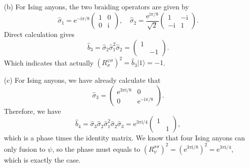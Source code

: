 \documentclass{book}
\begin{document}
(b) For Ising anyons, the two braiding operators are given by
\begin{equation*}
\hat{\sigma }_{1} =\mathrm{e}^{-\mathrm{i} \pi /8}\begin{pmatrix}
1 & 0\\
0 & \mathrm{i}
\end{pmatrix} ,\quad \hat{\sigma }_{2} =\frac{\mathrm{e}^{\mathrm{i} \pi /8}}{\sqrt{2}}\begin{pmatrix}
1 & -\mathrm{i}\\
-\mathrm{i} & 1
\end{pmatrix} .
\end{equation*}
Direct calculation gives
\begin{equation*}
\hat{b}_{3} =\hat{\sigma }_{2}\hat{\sigma }_{1}^{2}\hat{\sigma }_{2} =\begin{pmatrix}
1 & \\
 & -1
\end{pmatrix} .
\end{equation*}
Which indicates that actually $(R_{\sigma }^{\psi \sigma } )^{2} =\hat{b}_{3} |1 \rangle =-1$. 



(c) For Ising anyons, we have already calculate that
\begin{equation*}
\hat{\sigma }_{3} =\begin{pmatrix}
\mathrm{e}^{3\pi \mathrm{i} /8} & 0\\
0 & \mathrm{e}^{-\mathrm{i} \pi /8}
\end{pmatrix} .
\end{equation*}
Therefore, we have
\begin{equation*}
\hat{b}_{4} =\hat{\sigma }_{3}\hat{\sigma }_{2}\hat{\sigma }_{1}^{2}\hat{\sigma }_{2}\hat{\sigma }_{3} =\mathrm{e}^{3\pi \mathrm{i} /4}\begin{pmatrix}
1 & \\
 & 1
\end{pmatrix} ,
\end{equation*}
which is a phase times the identity matrix. We know that four Ising anyons can only fusion to $\psi $, so the phase must equals to $(R_{\psi }^{\sigma \sigma } )^{2} =(\mathrm{e}^{3\pi \mathrm{i} /8} )^{2} =\mathrm{e}^{3\pi \mathrm{i} /4}$, which is exactly the case. 
\end{document}
